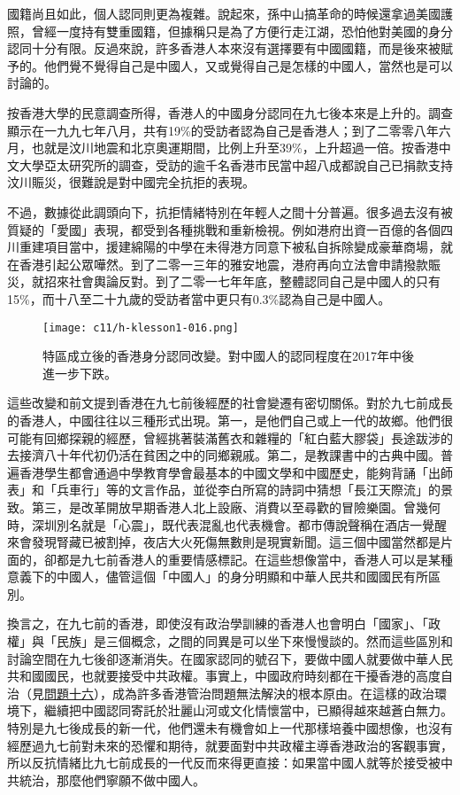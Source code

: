 國籍尚且如此，個人認同則更為複雜。說起來，孫中山搞革命的時候還拿過美國護照，曾經一度持有雙重國籍，但據稱只是為了方便行走江湖，恐怕他對美國的身分認同十分有限。反過來說，許多香港人本來沒有選擇要有中國國籍，而是後來被賦予的。他們覺不覺得自己是中國人，又或覺得自己是怎樣的中國人，當然也是可以討論的。

按香港大學的民意調查所得，香港人的中國身分認同在九七後本來是上升的。調查顯示在一九九七年八月，共有19\%的受訪者認為自己是香港人；到了二零零八年六月，也就是汶川地震和北京奧運期間，比例上升至39\%，上升超過一倍。按香港中文大學亞太研究所的調查，受訪的逾千名香港市民當中超八成都說自己已捐款支持汶川賑災，很難說是對中國完全抗拒的表現。

不過，數據從此調頭向下，抗拒情緒特別在年輕人之間十分普遍。很多過去沒有被質疑的「愛國」表現，都受到各種挑戰和重新檢視。例如港府出資一百億的各個四川重建項目當中，援建綿陽的中學在未得港方同意下被私自拆除變成豪華商場，就在香港引起公眾嘩然。到了二零一三年的雅安地震，港府再向立法會申請撥款賑災，就招來社會輿論反對。到了二零一七年年底，整體認同自己是中國人的只有15\%，而十八至二十九歲的受訪者當中更只有0.3\%認為自己是中國人。

\begin{figure}[htbp]
    \centering
    \texttt{[image: c11/h-klesson1-016.png]}
    \caption{特區成立後的香港身分認同改變。對中國人的認同程度在2017年中後進一步下跌。} 
\end{figure}

這些改變和前文提到香港在九七前後經歷的社會變遷有密切關係。對於九七前成長的香港人，中國往往以三種形式出現。第一，是他們自己或上一代的故鄉。他們很可能有回鄉探親的經歷，曾經挑著裝滿舊衣和雜糧的「紅白藍大膠袋」長途跋涉的去接濟八十年代初仍活在貧困之中的同鄉親戚。第二，是教課書中的古典中國。普遍香港學生都會通過中學教育學會最基本的中國文學和中國歷史，能夠背誦「出師表」和「兵車行」等的文言作品，並從李白所寫的詩詞中猜想「長江天際流」的景致。第三，是改革開放早期香港人北上設廠、消費以至尋歡的冒險樂園。曾幾何時，深圳別名就是「心震」，既代表混亂也代表機會。都市傳說聲稱在酒店一覺醒來會發現腎藏已被割掉，夜店大火死傷無數則是現實新聞。這三個中國當然都是片面的，卻都是九七前香港人的重要情感標記。在這些想像當中，香港人可以是某種意義下的中國人，儘管這個「中國人」的身分明顯和中華人民共和國國民有所區別。

換言之，在九七前的香港，即使沒有政治學訓練的香港人也會明白「國家」、「政權」與「民族」是三個概念，之間的同異是可以坐下來慢慢談的。然而這些區別和討論空間在九七後卻逐漸消失。在國家認同的號召下，要做中國人就要做中華人民共和國國民，也就要接受中共政權。事實上，中國政府時刻都在干擾香港的高度自治（見\hyperref[sec:sec16]{問題十六}），成為許多香港管治問題無法解決的根本原由。在這樣的政治環境下，繼續把中國認同寄託於壯麗山河或文化情懷當中，已顯得越來越蒼白無力。特別是九七後成長的新一代，他們還未有機會如上一代那樣培養中國想像，也沒有經歷過九七前對未來的恐懼和期待，就要面對中共政權主導香港政治的客觀事實，所以反抗情緒比九七前成長的一代反而來得更直接：如果當中國人就等於接受被中共統治，那麼他們寧願不做中國人。

